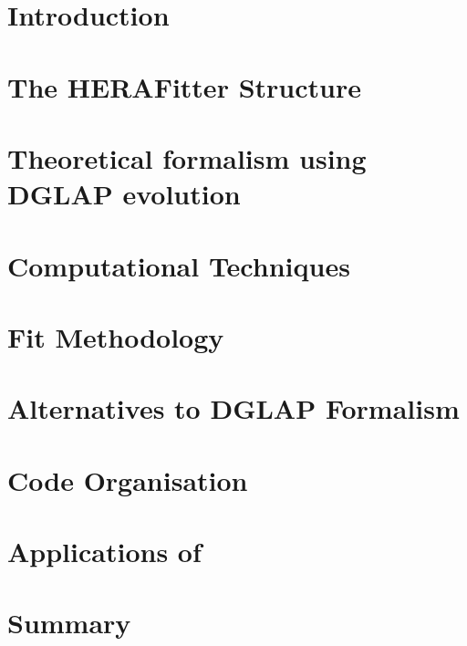 \tableofcontents
            

\section{Introduction}
\label{sec:intro}

\section{The HERAFitter Structure}

\section{Theoretical formalism using DGLAP evolution}
\label{sec:theory}



%
\section{Computational Techniques}
\label{sec:techniques}


\section{Fit Methodology}
\label{sec:method}


\section{Alternatives to DGLAP Formalism}
\label{sec:alternative}


\section{\fitter Code Organisation}
\label{sec:organisation.tex}


\section{Applications of \fitter}
\label{sec:examples}



\section{Summary}
\label{sec:outlook}





